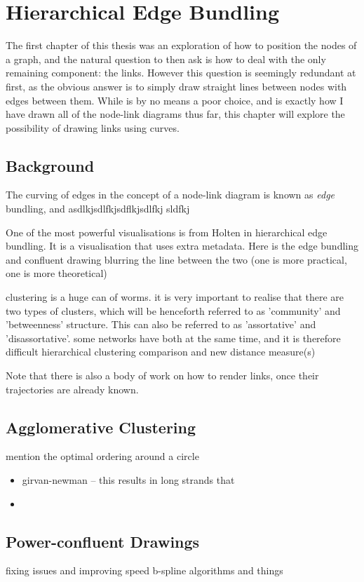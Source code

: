 \chapter{Hierarchical Edge Bundling}
The first chapter of this thesis was an exploration of how to position the nodes of a graph, and the natural question to then ask is how to deal with the only remaining component: the links. However this question is seemingly redundant at first, as the obvious answer is to simply draw straight lines between nodes with edges between them. While is by no means a poor choice, and is exactly how I have drawn all of the node-link diagrams thus far, this chapter will explore the possibility of drawing links using curves.

\section{Background}
The curving of edges in the concept of a node-link diagram is known as \textit{edge} bundling, and asdlkjsdlfkjsdflkjsdlfkj
sldfkj

One of the most powerful visualisations is from Holten in hierarchical edge bundling. It is a visualisation that uses extra metadata. Here is the 
edge bundling and confluent drawing
blurring the line between the two (one is more practical, one is more theoretical)

clustering is a huge can of worms.
it is very important to realise that there are two types of clusters, which will be henceforth referred to as 'community' and 'betweenness' structure. This can also be referred to as 'assortative' and 'disassortative'.
some networks have both at the same time, and it is therefore difficult 
hierarchical clustering comparison and new distance measure(s)

Note that there is also a body of work on how to render links, once their trajectories are already known.

\section{Agglomerative Clustering}

mention the optimal ordering around a circle

\begin{itemize}
    \item girvan-newman -- this results in long strands that \item
\end{itemize}

\section{Power-confluent Drawings}
fixing issues and improving speed
b-spline algorithms and things